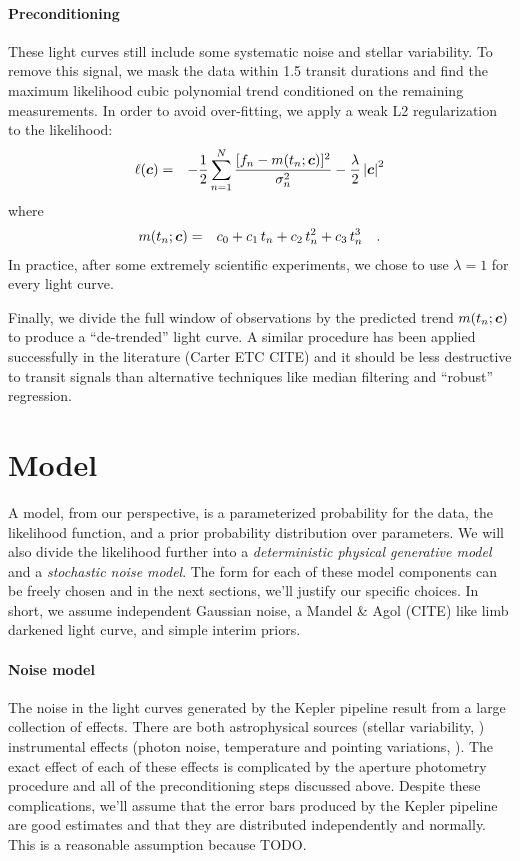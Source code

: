 \documentclass[12pt,preprint]{aastex}
\begin{document}
\paragraph{Preconditioning}
These light curves still include some systematic noise and stellar
variability.
To remove this signal, we mask the data within 1.5 transit durations and find
the maximum likelihood cubic polynomial trend conditioned on the remaining
measurements.
In order to avoid over-fitting, we apply a weak L2 regularization to the
likelihood:
\begin{eqnarray}
\ell(\boldsymbol{c}) &=& -\frac{1}{2}\sum_{n=1}^N \frac{[f_n - m(t_n; \boldsymbol{c})]^2}
                                                 {\sigma_n^2}
                   -\frac{\lambda}{2} \left | \boldsymbol{c} \right |^2
\end{eqnarray}
where
\begin{eqnarray}
m(t_n;\boldsymbol{c}) &=& c_0 + c_1\,t_n + c_2\,t_n^2 + c_3\,t_n^3 \quad.
\end{eqnarray}
In practice, after some extremely scientific experiments, we chose to use
$\lambda = 1$ for every light curve.

Finally, we divide the full window of observations by the predicted trend
$m(t_n;\boldsymbol{c})$ to produce a ``de-trended'' light curve.
A similar procedure has been applied successfully in the literature (Carter ETC
CITE) and it should be less destructive to transit signals than alternative
techniques like median filtering and ``robust'' regression.

\section{Model}

A model, from our perspective, is a parameterized probability for the data,
the likelihood function, and a prior probability distribution over parameters.
We will also divide the likelihood further into a \emph{deterministic physical
generative model} and a \emph{stochastic noise model}.
The form for each of these model components can be freely chosen and in the
next sections, we'll justify our specific choices.
In short, we assume independent Gaussian noise, a Mandel \& Agol (CITE) like
limb darkened light curve, and simple interim priors.

\paragraph{Noise model}
The noise in the light curves generated by the Kepler pipeline result from a
large collection of effects.
There are both astrophysical sources (stellar variability, \etc) instrumental
effects (photon noise, temperature and pointing variations, \etc).
The exact effect of each of these effects is complicated by the aperture
photometry procedure and all of the preconditioning steps discussed above.
Despite these complications, we'll assume that the error bars produced by the
Kepler pipeline are good estimates and that they are distributed independently
and normally.
This is a reasonable assumption because TODO.
\end{document}
